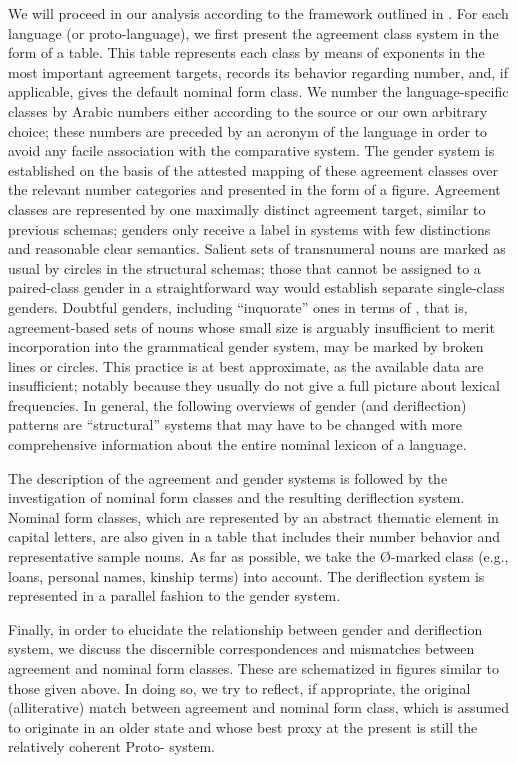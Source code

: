\documentclass[output=collectionpaper]{langsci/langscibook}
\begin{document}
We will proceed in our analysis according to the framework outlined in . For each language (or proto-language), we first present the agreement class system in the form of a table. This table represents each class by means of exponents in the most important agreement targets, records its behavior regarding number, and, if applicable, gives the default nominal form class. We number the language-specific classes by Arabic numbers either according to the source or our own arbitrary choice; these numbers are preceded by an acronym of the language in order to avoid any facile association with the comparative  system. The gender system is established on the basis of the attested mapping of these agreement classes over the relevant number categories and presented in the form of a figure. Agreement classes are represented by one maximally distinct agreement target, similar to previous schemas; genders only receive a label in systems with few distinctions and reasonable clear semantics. Salient sets of transnumeral nouns are marked as usual by circles in the structural schemas; those that cannot be assigned to a paired-class gender in a straightforward way would establish separate single-class genders. Doubtful genders, including ``inquorate'' ones in terms of \citet[170--175]{Corbett1991}, that is, agreement-based sets of nouns whose small size is arguably insufficient to merit incorporation into the grammatical gender system, may be marked by broken lines or circles. This practice is at best approximate, as the available data are insufficient; notably because they usually do not give a full picture about lexical frequencies. In general, the following overviews of gender (and deriflection) patterns are ``structural'' systems that may have to be changed with more comprehensive information about the entire nominal lexicon of a language.

The description of the agreement and gender systems is followed by the investigation of nominal form classes and the resulting deriflection system. Nominal form classes, which are represented by an abstract thematic element in capital letters, are also given in a table that includes their number behavior and representative sample nouns. As far as possible, we take the Ø-marked class (e.g., loans, personal names, kinship terms) into account. The deriflection system is represented in a parallel fashion to the gender system.

Finally, in order to elucidate the relationship between gender and deriflection system, we discuss the discernible correspondences and mismatches between agreement and nominal form classes. These are schematized in figures similar to those given above. In doing so, we try to reflect, if appropriate, the original (alliterative) match between agreement and nominal form class, which is assumed to originate in an older  state and whose best proxy at the present is still the relatively coherent Proto- system.
\end{document}
